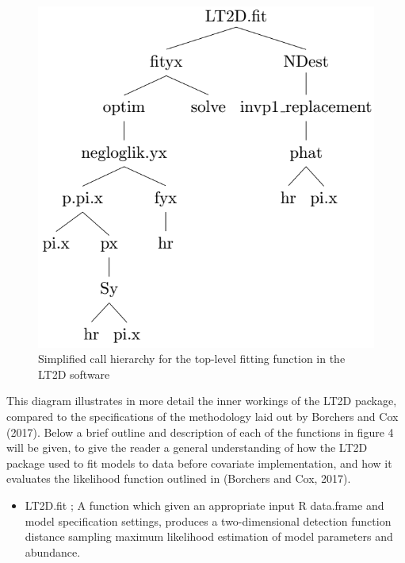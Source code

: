 \documentclass[11pt]{article}
\begin{document}
\begin{multicols}{2}
\begin{figure}[H]
\centering
\includegraphics[scale=0.507]{LT2Dprecov}
\caption{Simplified call hierarchy for the top-level fitting function in the LT2D software}
\end{figure}

This diagram illustrates in more detail the inner workings of the LT2D package, compared to the specifications of the methodology laid out by Borchers and Cox (2017). Below a brief outline and description of each of the functions in figure 4 will be given, to give the reader a general understanding of how the LT2D package used to fit models to data before covariate implementation, and how it evaluates the likelihood function outlined in (Borchers and Cox, 2017).

\begin{itemize}
\item LT2D.fit ; A function which given an appropriate input R data.frame and model specification settings, produces a two-dimensional detection function distance sampling maximum likelihood estimation of model parameters and abundance.


\end{itemize}
\end{multicols}
\end{document}
